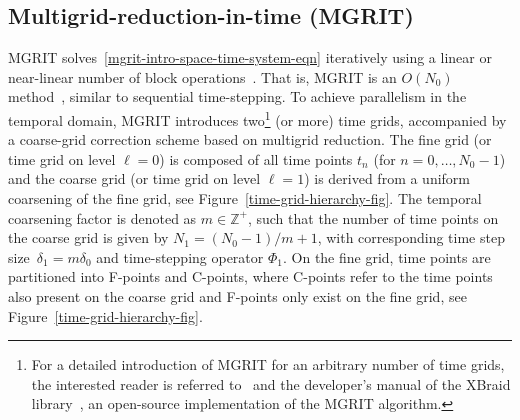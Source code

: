 \documentclass[3p]{elsarticle}
\begin{document}
\subsection{Multigrid-reduction-in-time (MGRIT)}
\label{mgrit-time-grid-hierarchy-sec}
MGRIT solves~\eqref{mgrit-intro-space-time-system-eqn} iteratively using a linear or near-linear number of block
operations~\cite{HessenthalerSouthworthNordslettenRoehrleFalgoutSchroder2020}. That is, MGRIT is an $O (N_0)$
method~\cite{FriedhoffFalgoutKolevMaclachlanSchroder2012,FalgoutFriedhoffKolevMaclachlanSchroder2014},
similar to sequential time-stepping.
To achieve parallelism in the temporal domain, MGRIT introduces two\footnote{For a detailed introduction
of MGRIT for an arbitrary number of time grids, the interested reader is referred
to~\cite{FriedhoffFalgoutKolevMaclachlanSchroder2012,FalgoutFriedhoffKolevMaclachlanSchroder2014}
and the developer's manual of the {XBraid} library~\cite{XBraid},
an open-source implementation of the MGRIT algorithm.}
(or more) time grids,
accompanied by a coarse-grid correction scheme based on multigrid reduction.
The fine grid (or time grid on level $\ell = 0$) is composed of all time points
$t_n$ (for $n = 0, \ldots, N_0 - 1$) and the coarse grid (or time grid on level $\ell = 1$)
is derived from a uniform coarsening of the fine grid, see Figure~\ref{time-grid-hierarchy-fig}.
The temporal coarsening factor is denoted as $m \in \mathbb{Z}^+$,
such that the number of time points on the coarse grid is given by $N_1 = ( N_0 - 1 ) / m + 1$,
with corresponding time step size~$\delta_1 = m \delta_0$ and time-stepping operator $\Phi_1$.
On the fine grid, time points are partitioned into F-points and C-points, where C-points refer to the time points
also present on the coarse grid and F-points only exist on the fine grid, see Figure~\ref{time-grid-hierarchy-fig}.
\end{document}
